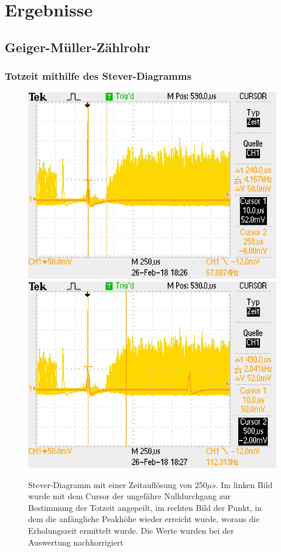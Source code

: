 \documentclass[12pt,a4paper]{article}
\begin{document}
\section{Ergebnisse}
\subsection{Geiger-Müller-Zählrohr}

\subsubsection{Totzeit mithilfe des Stever-Diagramms}

\begin{figure}
\centering
\includegraphics[scale=0.49]{Bilder/Stever/Stever1_1.PNG}
\includegraphics[scale=0.49]{Bilder/Stever/Stever1_2.PNG}
\caption{Stever-Diagramm mit einer Zeitauflösung von 250$\mu s$. Im linken Bild wurde mit dem Cursor der ungefähre Nulldurchgang zur Bestimmung der Totzeit angepeilt, im rechten Bild der Punkt, in dem die anfängliche Peakhöhe wieder erreicht wurde, woraus die Erholungszeit ermittelt wurde. Die Werte wurden bei der Auswertung nachkorrigiert}
\label{fig:Stever}
\end{figure}
\end{document}

